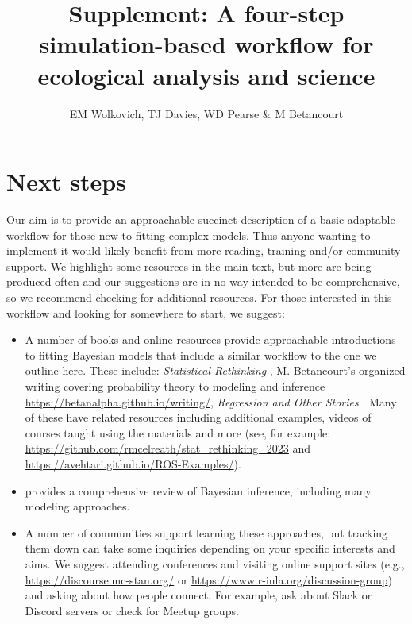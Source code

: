 \documentclass[11pt]{article}
\begin{document}


\renewcommand{\refname}{\CHead{}}


\title{Supplement: A four-step simulation-based workflow for ecological analysis and science}
\author{EM Wolkovich, TJ Davies, WD Pearse \& M Betancourt}
\maketitle

\renewcommand{\thetable}{S\arabic{table}}
\renewcommand{\thefigure}{S\arabic{figure}}

\section*{Next steps}
Our aim is to provide an approachable succinct description of a basic adaptable workflow for those new to fitting complex models. Thus anyone wanting to implement it would likely benefit from more reading, training and/or community support. We highlight some resources in the main text, but more are being produced often and our suggestions are in no way intended to be comprehensive, so we recommend checking for additional resources. For those interested in this workflow and looking for somewhere to start, we suggest:
\begin{itemize}
\item A number of books and online resources provide approachable introductions to fitting Bayesian models that include a similar workflow to the one we outline here. These include: \emph{Statistical Rethinking} \citep{statrethink}, M. Betancourt's organized writing covering probability theory to modeling and inference \url{https://betanalpha.github.io/writing/}, \emph{Regression and Other Stories} \citep{regotherstories}. Many of these have related resources including additional examples, videos of courses taught using the materials and more (see, for example: \url{https://github.com/rmcelreath/stat_rethinking_2023} and \\ \url{https://avehtari.github.io/ROS-Examples/}). 
\item \citet{BDA} provides a comprehensive review of Bayesian inference, including many modeling approaches. 
\item A number of communities support learning these approaches, but tracking them down can take some inquiries depending on your specific interests and aims. We suggest attending conferences and visiting online support sites (e.g., \url{https://discourse.mc-stan.org/} or \url{https://www.r-inla.org/discussion-group}) and asking about how people connect. For example, ask about Slack or Discord servers or check for Meetup groups. 
\end{itemize}
\end{document}

